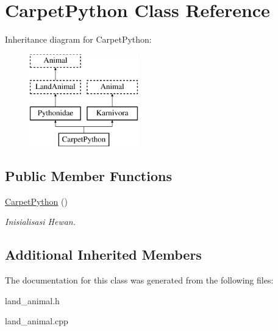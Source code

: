 \hypertarget{class_carpet_python}{}\section{Carpet\+Python Class Reference}
\label{class_carpet_python}
Inheritance diagram for Carpet\+Python\+:\begin{figure}[H]
\begin{center}
\leavevmode
\includegraphics[height=4.000000cm]{class_carpet_python}
\end{center}
\end{figure}
\subsection*{Public Member Functions}
\begin{DoxyCompactItemize}
\item 
\hyperlink{class_carpet_python_a80b127b8fc3ea38b30e1b22f0f2195da}{Carpet\+Python} ()\hypertarget{class_carpet_python_a80b127b8fc3ea38b30e1b22f0f2195da}{}\label{class_carpet_python_a80b127b8fc3ea38b30e1b22f0f2195da}

\begin{DoxyCompactList}\small\item\em Inisialisasi Hewan. \end{DoxyCompactList}\end{DoxyCompactItemize}
\subsection*{Additional Inherited Members}


The documentation for this class was generated from the following files\+:\begin{DoxyCompactItemize}
\item 
land\+\_\+animal.\+h\item 
land\+\_\+animal.\+cpp\end{DoxyCompactItemize}
